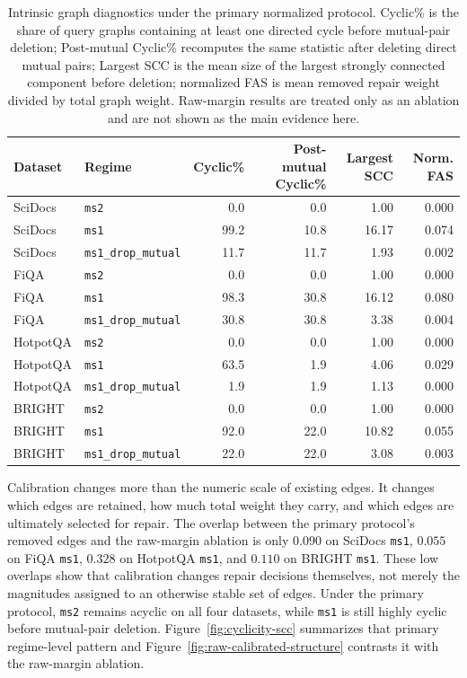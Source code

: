 \documentclass[manuscript,anonymous,review]{acmart}
\begin{document}
\begin{table}[t]
  \caption{Intrinsic graph diagnostics under the primary normalized protocol.
    Cyclic\% is the share of query graphs containing at least one directed
    cycle before mutual-pair deletion; Post-mutual Cyclic\% recomputes the same
    statistic after deleting direct mutual pairs; Largest SCC is the mean size
    of the largest strongly connected component before deletion; normalized FAS
    is mean removed repair weight divided by total graph weight. Raw-margin
    results are treated only as an ablation and are not shown as the main
    evidence here.}
  \label{tab:structural-results}
  \scriptsize
  \begin{tabular}{llrrrr}
    \toprule
    Dataset & Regime & Cyclic\% & Post-mutual Cyclic\% & Largest SCC & Norm. FAS \\
    \midrule
    SciDocs  & \texttt{ms2}               & 0.0  & 0.0  & 1.00  & 0.000 \\
    SciDocs  & \texttt{ms1}               & 99.2 & 10.8 & 16.17 & 0.074 \\
    SciDocs  & \texttt{ms1\_drop\_mutual} & 11.7 & 11.7 & 1.93  & 0.002 \\
    FiQA     & \texttt{ms2}               & 0.0  & 0.0  & 1.00  & 0.000 \\
    FiQA     & \texttt{ms1}               & 98.3 & 30.8 & 16.12 & 0.080 \\
    FiQA     & \texttt{ms1\_drop\_mutual} & 30.8 & 30.8 & 3.38  & 0.004 \\
    HotpotQA & \texttt{ms2}               & 0.0  & 0.0  & 1.00  & 0.000 \\
    HotpotQA & \texttt{ms1}               & 63.5 & 1.9  & 4.06  & 0.029 \\
    HotpotQA & \texttt{ms1\_drop\_mutual} & 1.9  & 1.9  & 1.13  & 0.000 \\
    BRIGHT   & \texttt{ms2}               & 0.0  & 0.0  & 1.00  & 0.000 \\
    BRIGHT   & \texttt{ms1}               & 92.0 & 22.0 & 10.82 & 0.055 \\
    BRIGHT   & \texttt{ms1\_drop\_mutual} & 22.0 & 22.0 & 3.08  & 0.003 \\
    \bottomrule
  \end{tabular}
\end{table}

Calibration changes more than the numeric scale of existing edges. It changes
which edges are retained, how much total weight they carry, and which edges are
ultimately selected for repair. The overlap between the primary protocol's
removed edges and the raw-margin ablation is only $0.090$ on SciDocs
\texttt{ms1}, $0.055$ on FiQA \texttt{ms1}, $0.328$ on HotpotQA \texttt{ms1},
and $0.110$ on BRIGHT \texttt{ms1}. These low overlaps show that calibration
changes repair decisions themselves, not merely the magnitudes assigned to an
otherwise stable set of edges. Under the primary protocol, \texttt{ms2} remains
acyclic on all four datasets, while \texttt{ms1} is still highly cyclic before
mutual-pair deletion. Figure~\ref{fig:cyclicity-scc} summarizes that primary
regime-level pattern and Figure~\ref{fig:raw-calibrated-structure} contrasts it
with the raw-margin ablation.
\end{document}
